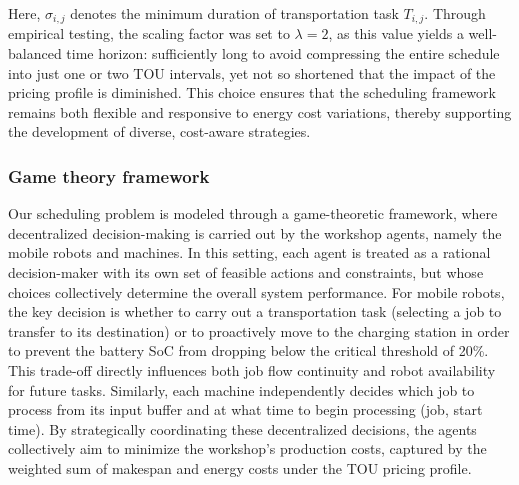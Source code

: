 \documentclass[preprint, 3p, review, 12pt]{elsarticle}
\begin{document}
Here, $\sigma_{i,j}$ denotes the minimum duration of transportation task $T_{i,j}$. Through empirical testing, the scaling factor was set to $\lambda = 2$, as this value yields a well-balanced time horizon: sufficiently long to avoid compressing the entire schedule into just one or two TOU intervals, yet not so shortened that the impact of the pricing profile is diminished. This choice ensures that the scheduling framework remains both flexible and responsive to energy cost variations, thereby supporting the development of diverse, cost-aware strategies.

\subsubsection{Game theory framework}
Our scheduling problem is modeled through a game-theoretic framework, where decentralized decision-making is carried out by the workshop agents, namely the mobile robots and machines. In this setting, each agent is treated as a rational decision-maker with its own set of feasible actions and constraints, but whose choices collectively determine the overall system performance. For mobile robots, the key decision is whether to carry out a transportation task (selecting a job to transfer to its destination) or to proactively move to the charging station in order to prevent the battery SoC from dropping below the critical threshold of 20\%. This trade-off directly influences both job flow continuity and robot availability for future tasks. Similarly, each machine independently decides which job to process from its input buffer and at what time to begin processing (job, start time). By strategically coordinating these decentralized decisions, the agents collectively aim to minimize the workshop’s production costs, captured by the weighted sum of makespan and energy costs under the TOU pricing profile.
\end{document}
